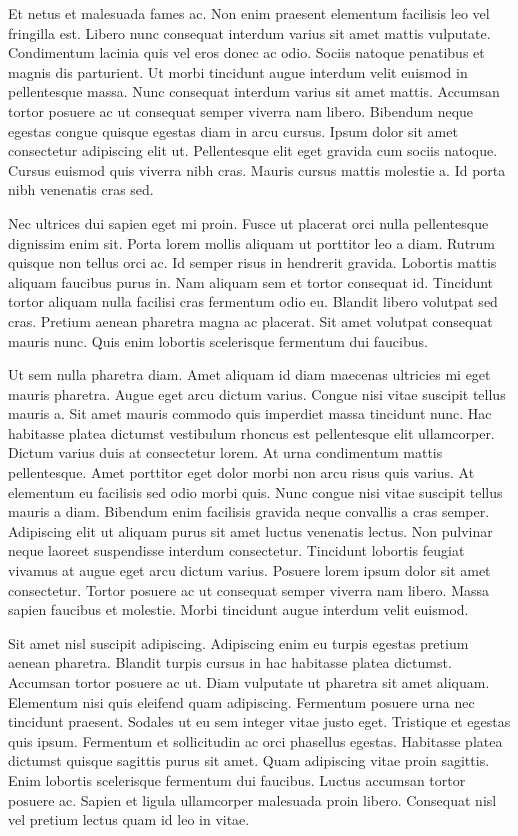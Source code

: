 \documentclass[11pt,a4paper]{article}
\begin{document}
Et netus et malesuada fames ac. Non enim praesent elementum facilisis leo vel fringilla est. Libero nunc consequat interdum varius sit amet mattis vulputate. Condimentum lacinia quis vel eros donec ac odio. Sociis natoque penatibus et magnis dis parturient. Ut morbi tincidunt augue interdum velit euismod in pellentesque massa. Nunc consequat interdum varius sit amet mattis. Accumsan tortor posuere ac ut consequat semper viverra nam libero. Bibendum neque egestas congue quisque egestas diam in arcu cursus. Ipsum dolor sit amet consectetur adipiscing elit ut. Pellentesque elit eget gravida cum sociis natoque. Cursus euismod quis viverra nibh cras. Mauris cursus mattis molestie a. Id porta nibh venenatis cras sed.

Nec ultrices dui sapien eget mi proin. Fusce ut placerat orci nulla pellentesque dignissim enim sit. Porta lorem mollis aliquam ut porttitor leo a diam. Rutrum quisque non tellus orci ac. Id semper risus in hendrerit gravida. Lobortis mattis aliquam faucibus purus in. Nam aliquam sem et tortor consequat id. Tincidunt tortor aliquam nulla facilisi cras fermentum odio eu. Blandit libero volutpat sed cras. Pretium aenean pharetra magna ac placerat. Sit amet volutpat consequat mauris nunc. Quis enim lobortis scelerisque fermentum dui faucibus.

Ut sem nulla pharetra diam. Amet aliquam id diam maecenas ultricies mi eget mauris pharetra. Augue eget arcu dictum varius. Congue nisi vitae suscipit tellus mauris a. Sit amet mauris commodo quis imperdiet massa tincidunt nunc. Hac habitasse platea dictumst vestibulum rhoncus est pellentesque elit ullamcorper. Dictum varius duis at consectetur lorem. At urna condimentum mattis pellentesque. Amet porttitor eget dolor morbi non arcu risus quis varius. At elementum eu facilisis sed odio morbi quis. Nunc congue nisi vitae suscipit tellus mauris a diam. Bibendum enim facilisis gravida neque convallis a cras semper. Adipiscing elit ut aliquam purus sit amet luctus venenatis lectus. Non pulvinar neque laoreet suspendisse interdum consectetur. Tincidunt lobortis feugiat vivamus at augue eget arcu dictum varius. Posuere lorem ipsum dolor sit amet consectetur. Tortor posuere ac ut consequat semper viverra nam libero. Massa sapien faucibus et molestie. Morbi tincidunt augue interdum velit euismod.

Sit amet nisl suscipit adipiscing. Adipiscing enim eu turpis egestas pretium aenean pharetra. Blandit turpis cursus in hac habitasse platea dictumst. Accumsan tortor posuere ac ut. Diam vulputate ut pharetra sit amet aliquam. Elementum nisi quis eleifend quam adipiscing. Fermentum posuere urna nec tincidunt praesent. Sodales ut eu sem integer vitae justo eget. Tristique et egestas quis ipsum. Fermentum et sollicitudin ac orci phasellus egestas. Habitasse platea dictumst quisque sagittis purus sit amet. Quam adipiscing vitae proin sagittis. Enim lobortis scelerisque fermentum dui faucibus. Luctus accumsan tortor posuere ac. Sapien et ligula ullamcorper malesuada proin libero. Consequat nisl vel pretium lectus quam id leo in vitae.
\end{document}
